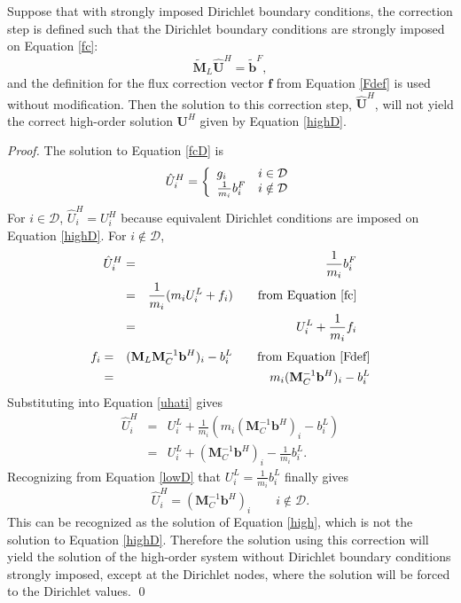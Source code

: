 \begin{lemma}
   Suppose that with strongly imposed Dirichlet boundary conditions, the
   correction step is defined such that the Dirichlet boundary conditions
   are strongly imposed on Equation \ref{fc}:
   \begin{equation}\label{fcD}
      \tilde{\mathbf{M}}_L\hat{\mathbf{U}}^H = \tilde{\mathbf{b}}^F,
   \end{equation}
   and the definition for the flux correction vector $\mathbf{f}$ from
   Equation \ref{Fdef} is used without modification. Then the solution
   to this correction step, $\hat{\mathbf{U}}^H$, will not yield the
   correct high-order solution $\mathbf{U}^H$ given by Equation \ref{highD}.
\end{lemma}
\begin{proof}
   The solution to Equation \ref{fcD} is
   \begin{equation}
      \hat{U}^H_i = \left\{
      \begin{array}{l l}
         g_i                & i\in\mathcal{D}\\
         \frac{1}{m_i}b^F_i & i\notin\mathcal{D}
      \end{array}
      \right.
   \end{equation}
   For $i\in\mathcal{D}$, $\hat{U}^H_i = U_i^H$ because equivalent Dirichlet
   conditions are imposed on Equation \ref{highD}. For $i\notin\mathcal{D}$,
   \begin{eqnarray}
      \hat{U}^H_i & = & \frac{1}{m_i}b^F_i\\
                  & = & \frac{1}{m_i}(m_i U_i^L + f_i)\qquad\mbox{from Equation \ref{fc}}\\
                  & = & U_i^L + \frac{1}{m_i}f_i\label{uhati}
   \end{eqnarray}
   \begin{eqnarray}
      f_i & = & (\mathbf{M}_L\mathbf{M}_C^{-1}\mathbf{b}^H)_i - b^L_i
         \qquad\mbox{from Equation \ref{Fdef}}\\
          & = & m_i(\mathbf{M}_C^{-1}\mathbf{b}^H)_i - b^L_i
   \end{eqnarray}
   Substituting into Equation \ref{uhati} gives
   \begin{eqnarray}
      \hat{U}^H_i & = & U_i^L + \frac{1}{m_i}(m_i(\mathbf{M}_C^{-1}\mathbf{b}^H)_i - b^L_i)\\
                  & = & U_i^L + (\mathbf{M}_C^{-1}\mathbf{b}^H)_i - \frac{1}{m_i}b^L_i.
   \end{eqnarray}
   Recognizing from Equation \ref{lowD} that $U_i^L = \frac{1}{m_i}b^L_i$ finally gives
   \begin{equation}
      \hat{U}^H_i = (\mathbf{M}_C^{-1}\mathbf{b}^H)_i\qquad i\notin\mathcal{D}.
   \end{equation}
   This can be recognized as the solution of Equation \ref{high}, which is not the
   solution to Equation \ref{highD}. Therefore the solution using this correction will yield
   the solution of the high-order system without Dirichlet boundary conditions strongly
   imposed, except at the Dirichlet nodes, where the solution will be forced to the
   Dirichlet values.
   \qed
\end{proof}
